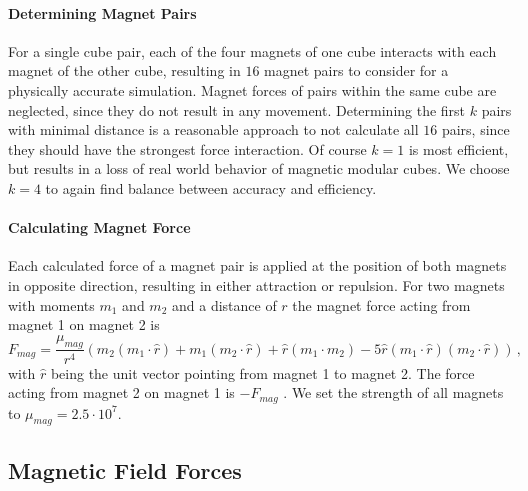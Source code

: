 \newpage

\paragraph{Determining Magnet Pairs}

For a single cube pair, each of the four magnets of one cube interacts with each magnet of the other cube, resulting in $16$ magnet pairs to consider for a physically accurate simulation.
Magnet forces of pairs within the same cube are neglected, since they do not result in any movement.
Determining the first $k$ pairs with minimal distance is a reasonable approach to not calculate all $16$ pairs, since they should have the strongest force interaction.
Of course $k=1$ is most efficient, but results in a loss of real world behavior of magnetic modular cubes.
We choose $k=4$ to again find balance between accuracy and efficiency.

\paragraph{Calculating Magnet Force}

Each calculated force of a magnet pair is applied at the position of both magnets in opposite direction, resulting in either attraction or repulsion.
For two magnets with moments $m_1$ and $m_2$ and a distance of $r$ the magnet force acting from magnet 1 on magnet 2 is
\begin{equation}
F_\textit{mag} = \frac{\mu_\textit{mag}}{r^4} \left(m_2(m_1 \cdotp \hat{r}) + m_1(m_2 \cdotp \hat{r}) + \hat{r}(m_1 \cdotp m_2) - 5\hat{r}(m_1 \cdotp \hat{r})(m_2 \cdotp \hat{r}) \right) \, ,
\end{equation}
with $\hat{r}$ being the unit vector pointing from magnet 1 to magnet 2.
The force acting from magnet 2 on magnet 1 is $-F_\textit{mag}$ \cite{levitt2013}.
We set the strength of all magnets to $\mu_\textit{mag} = 2.5 \cdot 10^7$. 

\newpage

\subsection{Magnetic Field Forces}
\label{sec:force_field}

